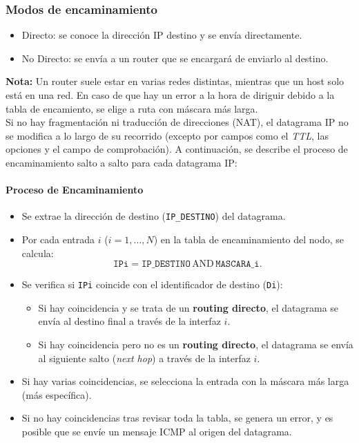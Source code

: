 \documentclass[a4paper,12pt]{article}
\begin{document}
\subsubsection*{Modos de encaminamiento}
\begin{itemize}
    \item Directo: se conoce la dirección IP destino y se envía directamente.
    \item No Directo: se envía a un router que se encargará de enviarlo al destino.
\end{itemize}

\textbf{Nota:} Un router suele estar en varias redes distintas, mientras que un host solo está en una red. En caso de que hay un error a la hora de diriguir debido a la tabla de encamiento, se elige a ruta con máscara más larga.\\

Si no hay fragmentación ni traducción de direcciones (NAT), el datagrama IP no se modifica a lo largo de su recorrido (excepto por campos como el \textit{TTL}, las opciones y el campo de comprobación). A continuación, se describe el proceso de encaminamiento salto a salto para cada datagrama IP:

\paragraph{Proceso de Encaminamiento}
\begin{itemize}
    \item Se extrae la dirección de destino (\texttt{IP\_DESTINO}) del datagrama.
    \item Por cada entrada \( i \) (\( i = 1, \dots, N \)) en la tabla de encaminamiento del nodo, se calcula:
    \[
    \texttt{IPi} = \texttt{IP\_DESTINO} \, \text{AND} \, \texttt{MASCARA\_i}.
    \]
    \item Se verifica si \texttt{IPi} coincide con el identificador de destino (\texttt{Di}):
    \begin{itemize}
        \item Si hay coincidencia y se trata de un \textbf{routing directo}, el datagrama se envía al destino final a través de la interfaz \( i \).
        \item Si hay coincidencia pero no es un \textbf{routing directo}, el datagrama se envía al siguiente salto (\textit{next hop}) a través de la interfaz \( i \).
    \end{itemize}
    \item Si hay varias coincidencias, se selecciona la entrada con la máscara más larga (más específica).
    \item Si no hay coincidencias tras revisar toda la tabla, se genera un error, y es posible que se envíe un mensaje ICMP al origen del datagrama.
\end{itemize}
\end{document}
